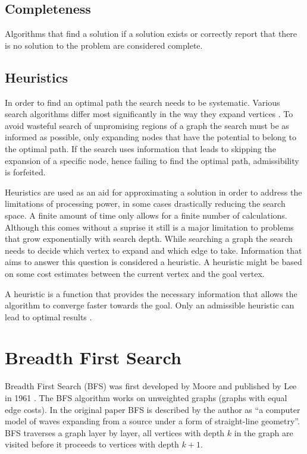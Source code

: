 \subsection{Completeness}
Algorithms that find a solution if a solution exists or correctly report that there is no solution to the problem are considered complete. \cite{LaValle.2006}

\subsection{Heuristics}
In order to find an optimal path the search needs to be systematic. Various search algorithms differ most significantly in the way they expand vertices \cite{LaValle.2006}. To avoid wasteful search of unpromising regions of a graph the search must be as informed as possible, only expanding nodes that have the potential to belong to the optimal path. If the search uses information that leads to skipping the expansion of a specific node, hence failing to find the optimal path, admissibility is forfeited.

Heuristics are used as an aid for approximating a solution in order to address the limitations of processing power, in some cases drastically reducing the search space. A finite amount of time only allows for a finite number of calculations. Although this comes without a suprise it still is a major limitation to problems that grow exponentially with search depth. While searching a graph the search needs to decide which vertex to expand and which edge to take. Information that aims to answer this question is considered a heuristic. A heuristic might be based on some cost estimates between the current vertex and the goal vertex. \cite{Newell.1976} 

A heuristic is a function that provides the necessary information that allows the algorithm to converge faster towards the goal. Only an admissible heuristic can lead to optimal results \cite{Hart.1968}.

\section{Breadth First Search}
Breadth First Search (BFS) was first developed by Moore and published by Lee in 1961 \cite{Lee.1961}. The BFS algorithm works on unweighted graphs (graphs with equal edge costs). In the original paper BFS is described by the author as ``a computer model of waves expanding from a source under a form of straight-line geometry''. BFS traverses a graph layer by layer, all vertices with depth $k$ in the graph are visited before it proceeds to vertices with depth $k+1$.

